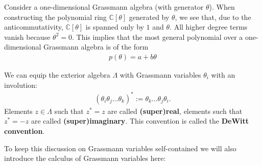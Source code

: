     \begin{property}
        Consider a one-dimensional Grassmann algebra (with generator $\theta$). When constructing the polynomial ring $\mathbb{C}[\theta]$ generated by $\theta$, we see that, due to the anticommutativity, $\mathbb{C}[\theta]$ is spanned only by $1$ and $\theta$. All higher degree terms vanish because $\theta^2 = 0$. This implies that the most general polynomial over a one-dimensional Grassmann algebra is of the form
        \begin{gather}
            p(\theta) = a + b\theta
        \end{gather}
    \end{property}

    \begin{definition}
        We can equip the exterior algebra $\Lambda$ with Grassmann variables $\theta_i$ with an involution:
        \begin{gather}
            (\theta_i\theta_j\ldots\theta_k)^* := \theta_k\ldots\theta_j\theta_i.
        \end{gather}
        Elements $z\in\Lambda$ such that $z^* = z$ are called \textbf{(super)real}, elements such that $z^* = -z$ are called \textbf{(super)imaginary}. This convention is called the \textbf{DeWitt convention}.
    \end{definition}

    To keep this discussion on Grassmann variables self-contained we will also introduce the calculus of Grassmann variables here:

